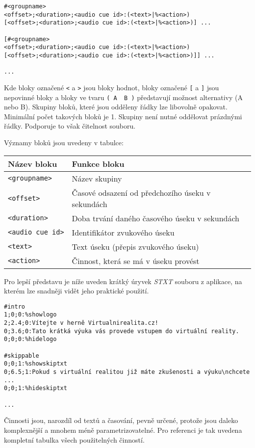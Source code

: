 \begin{verbatim}
#<groupname>
<offset>;<duration>;<audio cue id>:(<text>|%<action>)
[<offset>;<duration>;<audio cue id>:(<text>|%<action>)] ...

[#<groupname>
<offset>;<duration>;<audio cue id>:(<text>|%<action>)
[<offset>;<duration>;<audio cue id>:(<text>|%<action>)]] ...

...
\end{verbatim}

Kde bloky označené \texttt{\textless{}} a \texttt{\textgreater{}} jsou
bloky hodnot, bloky označené \texttt{{[}} a \texttt{{]}} jsou nepovinné
bloky a bloky ve tvaru \texttt{(\ A\ \textbar{}\ B\ )} představují
možnost alternativy (A nebo B). Skupiny bloků, které jsou odděleny řádky
lze libovolně opakovat. Minimální počet takových bloků je 1. Skupiny
není nutné oddělovat prázdnými řádky. Podporuje to však čitelnost souboru.

Významy bloků jsou uvedeny v tabulce:

\begin{longtable}[]{@{}ll@{}}
\toprule
Název bloku & Funkce bloku\tabularnewline
\midrule
\endhead
\texttt{\textless{}groupname\textgreater{}} & Název
skupiny\tabularnewline
\texttt{\textless{}offset\textgreater{}} & Časové odsazení od
předchozího úseku v sekundách\tabularnewline
\texttt{\textless{}duration\textgreater{}} & Doba trvání daného časového
úseku v sekundách\tabularnewline
\texttt{\textless{}audio\ cue\ id\textgreater{}} & Identifikátor
zvukového úseku\tabularnewline
\texttt{\textless{}text\textgreater{}} & Text úseku (přepis zvukového
úseku)\tabularnewline
\texttt{\textless{}action\textgreater{}} & Činnost, která se má v úseku
provést\tabularnewline
\bottomrule
\end{longtable}

Pro lepší představu je níže uveden krátký úryvek \emph{STXT} souboru z
aplikace, na kterém lze snadněji vidět jeho praktické použití.

\begin{verbatim}
#intro
1;0;0:%showlogo
2;2.4;0:Vítejte v herně Virtualnirealita.cz!
0;3.6;0:Tato krátká výuka vás provede vstupem do virtuální reality.
0;0;0:%hidelogo

#skippable
0;0;1:%showskiptxt
0;6.5;1:Pokud s virtuální realitou již máte zkušenosti a výuku\nchcete ...
0;0;1:%hideskiptxt

...
\end{verbatim}

Činnosti jsou, narozdíl od textů a časování, pevně určené, protože jsou
daleko komplexnější a mnohem méně parametrizovatelné. Pro referenci je
tak uvedena kompletní tabulka všech použitelných činností.

